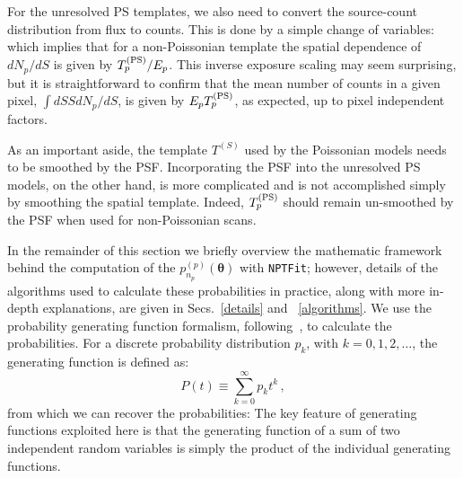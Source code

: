For the unresolved PS templates, we also need to convert the source-count distribution from flux to counts.  This is done by a simple change of variables:
which implies that for a non-Poissonian template the spatial dependence of $dN_p/dS$ is given by $T^{({\rm PS})}_p/E_p$. This inverse exposure scaling may seem surprising, but it is straightforward to confirm that the mean number of counts in a given pixel, $ \int dS S dN_p / dS$, is given by $E_p T^{({\rm PS})}_p$, as expected, up to pixel independent factors.

As an important aside, the template $T^{(S)}$ used by the Poissonian models needs to be smoothed by the PSF.  Incorporating the PSF into the unresolved PS models, on the other hand, is more complicated and is not accomplished simply by smoothing the spatial template.  Indeed, $T^{({\rm PS})}_p$ should remain un-smoothed by the PSF when used for non-Poissonian scans.



In the remainder of this section we briefly overview the mathematic framework behind the computation of the $p_{n_p}^{(p)}({\bm \theta})$ with \texttt{NPTFit}; however, details of the algorithms used to calculate these probabilities in practice, along with more in-depth explanations, are given in Secs.~\ref{details} and ~\ref{algorithms}.  We use the probability generating function formalism, following~\cite{Malyshev:2011zi}, to calculate the probabilities.   
For a discrete probability distribution $p_k$, with $k=0,1,2,\ldots$, the generating function is defined as:
\begin{equation}
P(t) \equiv \sum_{k=0}^{\infty} p_k t^k \,,
\label{prob-gen}
\end{equation}
from which we can recover the probabilities:
The key feature of generating functions exploited here is that the generating function of a sum of two independent random variables is simply the product of the individual generating functions. 

